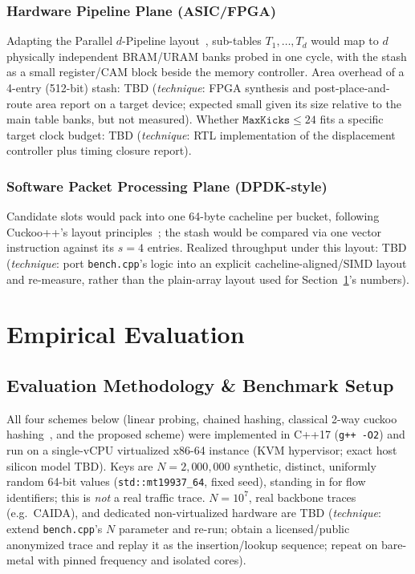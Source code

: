 \documentclass[conference]{IEEEtran}
\begin{document}
	\subsubsection{Hardware Pipeline Plane (ASIC/FPGA)}
	Adapting the Parallel $d$-Pipeline layout~\cite{pontarelli2016parallel},
	sub-tables $T_1,\dots,T_d$ would map to $d$ physically independent
	BRAM/URAM banks probed in one cycle, with the stash as a small
	register/CAM block beside the memory controller. Area overhead of a
	4-entry (512-bit) stash: TBD (\emph{technique}: FPGA synthesis and
	post-place-and-route area report on a target device; expected small
	given its size relative to the main table banks, but not measured).
	Whether $\mathtt{MaxKicks}\le 24$ fits a specific target clock budget:
	TBD (\emph{technique}: RTL implementation of the displacement
	controller plus timing closure report).
	
	\subsubsection{Software Packet Processing Plane (DPDK-style)}
	Candidate slots would pack into one 64-byte cacheline per bucket,
	following Cuckoo++'s layout principles~\cite{lescouarnec2018cuckoopp};
	the stash would be compared via one vector instruction against its
	$s=4$ entries. Realized throughput under this layout: TBD
	(\emph{technique}: port \texttt{bench.cpp}'s logic into an explicit
	cacheline-aligned/SIMD layout and re-measure, rather than the
	plain-array layout used for Section~\ref{sec:eval}'s numbers).
	
	\section{Empirical Evaluation}
	\label{sec:eval}
	
	\subsection{Evaluation Methodology \& Benchmark Setup}
	All four schemes below (linear probing, chained hashing, classical
	2-way cuckoo hashing~\cite{pagh2004cuckoo}, and the proposed scheme)
	were implemented in C++17 (\texttt{g++ -O2}) and run on a single-vCPU
	virtualized x86-64 instance (KVM hypervisor; exact host silicon model
	TBD). Keys are $N=2{,}000{,}000$ synthetic, distinct, uniformly random
	64-bit values (\texttt{std::mt19937\_64}, fixed seed), standing in for
	flow identifiers; this is \emph{not} a real traffic trace. $N=10^7$,
	real backbone traces (e.g.\ CAIDA), and dedicated non-virtualized
	hardware are TBD (\emph{technique}: extend \texttt{bench.cpp}'s $N$
	parameter and re-run; obtain a licensed/public anonymized trace and
	replay it as the insertion/lookup sequence; repeat on bare-metal with
	pinned frequency and isolated cores).
	
\end{document}
